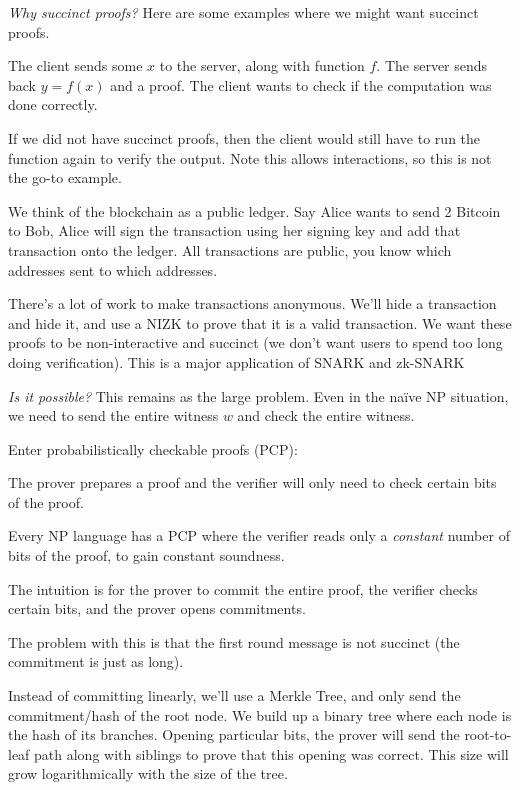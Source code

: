 \emph{Why succinct proofs?} Here are some examples where we might want succinct proofs.
\begin{example}
    The client sends some $x$ to the server, along with function $f$. The server sends back $y = f(x)$ and a proof. The client wants to check if the computation was done correctly.


    If we did not have succinct proofs, then the client would still have to run the function again to verify the output. Note this allows interactions, so this is not the go-to example.
\end{example}
\begin{example}
    We think of the blockchain as a public ledger. Say Alice wants to send 2 Bitcoin to Bob, Alice will sign the transaction using her signing key and add that transaction onto the ledger. All transactions are public, you know which addresses sent to which addresses.


    There's a lot of work to make transactions anonymous. We'll hide a transaction and hide it, and use a NIZK to prove that it is a valid transaction. We want these proofs to be non-interactive and succinct (we don't want users to spend too long doing verification). This is a major application of SNARK and zk-SNARK
\end{example}

\emph{Is it possible?} This remains as the large problem. Even in the na\"ive \textsf{NP} situation, we need to send the entire witness $w$ and check the entire witness.

Enter probabilistically checkable proofs (PCP):

The prover prepares a proof and the verifier will only need to check certain bits of the proof.


\begin{theorem}
    Every \textsf{NP} language has a PCP where the verifier reads only a \emph{constant} number of bits of the proof, to gain constant soundness.
\end{theorem}

The intuition is for the prover to commit the entire proof, the verifier checks certain bits, and the prover opens commitments.


The problem with this is that the first round message is not succinct (the commitment is just as long).

Instead of committing linearly, we'll use a Merkle Tree, and only send the commitment/hash of the root node. We build up a binary tree where each node is the hash of its branches. Opening particular bits, the prover will send the root-to-leaf path along with siblings to prove that this opening was correct. This size will grow logarithmically with the size of the tree.


